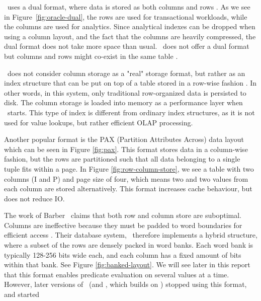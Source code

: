 \oracle~uses a dual format, where data is stored as both columns and rows \cite{Lahiri2015-mz}. As we see in Figure~\ref{fig:oracle-dual}, the rows are used for transactional workloads, while the columns are used for analytics. Since analytical indexes can be dropped when using a column layout, and the fact that the columns are heavily compressed, the dual format does not take more space than usual. \ibm~does not offer a dual format but columns and rows might co-exist in the same table \cite{Raman2013-em}.

\mssql~does not consider column storage as a "real" storage format, but rather as an index structure that can be put on top of a table stored in a row-wise fashion \cite{noauthor_undated-vq}. In other words, in this system, only traditional row-organized data is persisted to disk. The column storage is loaded into memory as a performance layer when \mssql~starts. This type of index is different from ordinary index structures, as it is not used for value lookups, but rather efficient OLAP processing.


Another popular format is the PAX (Partition Attributes Across) data layout \cite{Bjorklund2011-wh, Holloway2008-rr} which can be seen in Figure \ref{fig:pax}. This format stores data in a column-wise fashion, but the rows are partitioned such that all data belonging to a single tuple fits within a page. In Figure \ref{fig:row-column-store}, we see a table with two columns (I and P) and page size of four, which means two and two values from each column are stored alternatively. This format increases cache behaviour, but does not reduce IO.

The work of Barber \ea~claims that both row and column store are suboptimal. Columns are ineffective because they must be padded to word boundaries for efficient access \cite{Barber2012-xt}. Their database system, \blink~therefore implements a hybrid structure, where a subset of the rows are densely packed in word banks. Each word bank is typically 128-256 bits wide each, and each column has a fixed amount of bits within that bank. See Figure \ref{fig:banked-layout}. We will see later in this report that this format enables predicate evaluation on several values at a time. However, later versions of \blink~(and \ibm, which builds on \blink) stopped using this format, and started 


